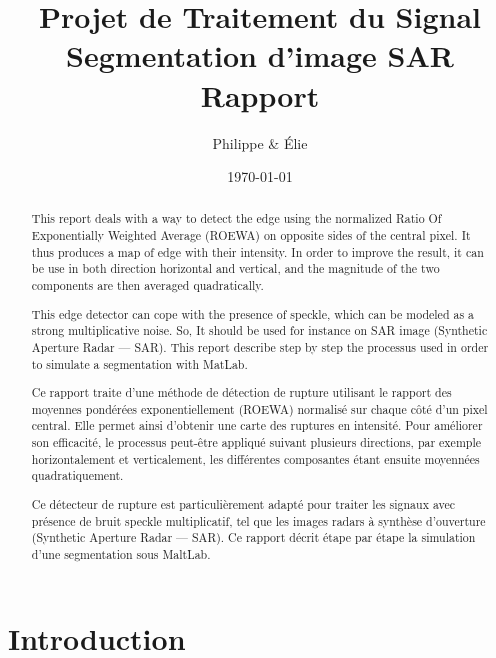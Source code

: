 \documentclass[a4paper,11pt]{article}
\title{Projet de Traitement du Signal\\Segmentation d'image SAR\\Rapport}
\author{Philippe \bsc{Tran Ba} \& Élie \bsc{Bouttier}}
\date\today
\begin{document}
\maketitle

\vspace{2cm}

\begin{abstract}

This report deals with a way to detect the edge using the normalized Ratio Of Exponentially Weighted Average (ROEWA) on opposite sides of the central pixel. It thus produces a map of edge with their intensity. In order to improve the result, it can be use in both direction horizontal and vertical, and the magnitude of the two components are then averaged quadratically.

This edge detector can cope with the presence of speckle, which can be modeled as a strong multiplicative noise. So, It should be used for instance on SAR image (Synthetic Aperture Radar — SAR). This report describe step by step the processus used in order to simulate a segmentation with MatLab.

\end{abstract}

\vspace{1cm}

\begin{abstract}

    Ce rapport traite d'une méthode de détection de rupture utilisant le rapport des moyennes pondérées exponentiellement (ROEWA) normalisé sur chaque côté d'un pixel central. Elle permet ainsi d'obtenir une carte des ruptures en intensité. Pour améliorer son efficacité, le processus peut-être appliqué suivant plusieurs directions, par exemple horizontalement et verticalement, les différentes composantes étant ensuite moyennées quadratiquement.

    Ce détecteur de rupture est particulièrement adapté pour traiter les signaux avec présence de bruit speckle multiplicatif, tel que les images radars à synthèse d'ouverture (Synthetic Aperture Radar — SAR). Ce rapport décrit étape par étape la simulation d'une segmentation sous MaltLab.

\end{abstract}

\newpage

\tableofcontents

\newpage

\section{Introduction}
\end{document}
